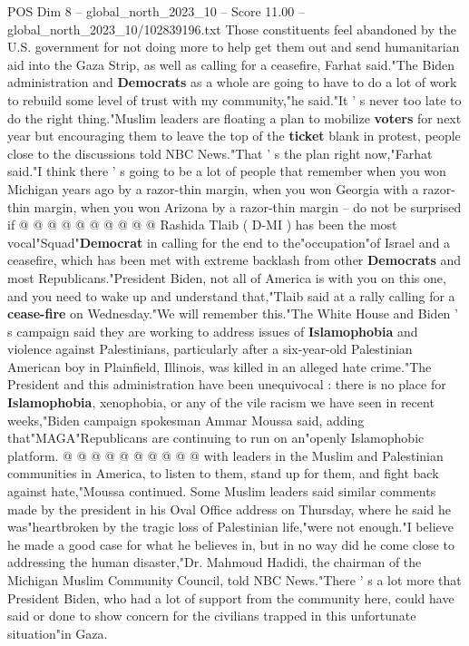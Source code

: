 \begin{textsample}{POS Dim 8 – global\_north\_2023\_10 – Score 11.00 – global\_north\_2023\_10/102839196.txt}
Those constituents feel abandoned by the U.S. government for not doing more to help get them out and send humanitarian aid into the Gaza Strip, as well as calling for a ceasefire, Farhat said."The Biden administration and \textbf{Democrats} as a whole are going to have to do a lot of work to rebuild some level of trust with my community,"he said."It ' s never too late to do the right thing."Muslim leaders are floating a plan to mobilize \textbf{voters} for next year but encouraging them to leave the top of the \textbf{ticket} blank in protest, people close to the discussions told NBC News."That ' s the plan right now,"Farhat said."I think there ' s going to be a lot of people that remember when you won Michigan years ago by a razor-thin margin, when you won Georgia with a razor-thin margin, when you won Arizona by a razor-thin margin -- do not be surprised if @ @ @ @ @ @ @ @ @ @ Rashida Tlaib ( D-MI ) has been the most vocal"Squad"\textbf{Democrat} in calling for the end to the"occupation"of Israel and a ceasefire, which has been met with extreme backlash from other \textbf{Democrats} and most Republicans."President Biden, not all of America is with you on this one, and you need to wake up and understand that,"Tlaib said at a rally calling for a \textbf{cease-fire} on Wednesday."We will remember this."The White House and Biden ' s campaign said they are working to address issues of \textbf{Islamophobia} and violence against Palestinians, particularly after a six-year-old Palestinian American boy in Plainfield, Illinois, was killed in an alleged hate crime."The President and this administration have been unequivocal : there is no place for \textbf{Islamophobia}, xenophobia, or any of the vile racism we have seen in recent weeks,"Biden campaign spokesman Ammar Moussa said, adding that"MAGA"Republicans are continuing to run on an"openly Islamophobic platform. @ @ @ @ @ @ @ @ @ @ with leaders in the Muslim and Palestinian communities in America, to listen to them, stand up for them, and fight back against hate,"Moussa continued.
Some Muslim leaders said similar comments made by the president in his Oval Office address on Thursday, where he said he was"heartbroken by the tragic loss of Palestinian life,"were not enough."I believe he made a good case for what he believes in, but in no way did he come close to addressing the human disaster,"Dr.
Mahmoud Hadidi, the chairman of the Michigan Muslim Community Council, told NBC News."There ' s a lot more that President Biden, who had a lot of support from the community here, could have said or done to show concern for the civilians trapped in this unfortunate situation"in Gaza.

\end{textsample}
